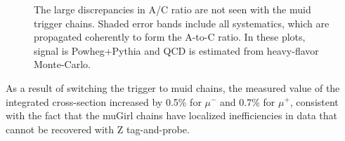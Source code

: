 \begin{figure}[phtb]
  \begin{center}
 \caption{ The large discrepancies in A/C ratio are not seen with the muid trigger chains. Shaded error bands include all systematics, which are propagated coherently to form the A-to-C ratio. In these plots, signal is Powheg+Pythia and QCD is estimated from heavy-flavor Monte-Carlo. }
 \label{fig:Wmunu:AC_new_W}
 \end{center}
\end{figure}

As a result of switching the trigger to muid chains, the measured value of the integrated cross-section increased by 0.5\% for $\mu^-$ and 0.7\% for $\mu^+$, consistent with the fact that the muGirl chains have localized inefficiencies in data that cannot be recovered with Z tag-and-probe.
